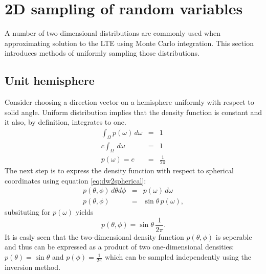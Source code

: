 \section{2D sampling of random variables}
A number of two-dimensional distributions are commonly used when approximating solution to the LTE using Monte Carlo integration. This section introduces methods of uniformly sampling those distributions.

\subsection{Unit hemisphere}
Consider choosing a direction vector on a hemisphere uniformly with respect to solid angle. Uniform distribution implies that the density function is constant and it also, by definition, integrates to one.
\begin{eqnarray}
  \int_{\Omega} p(\omega) \,d\omega &=& 1 \nonumber \\
  c \int_{\Omega} \,d\omega &=& 1 \nonumber \\
  p(\omega) = c &=& \frac{1}{2\pi}
\end{eqnarray}
The next step is to express the density function with respect to spherical coordinates using equation \ref{eq:dw2spherical}:
\begin{eqnarray}
  p(\theta, \phi) \, d\theta d\phi &=& p(\omega) \,d\omega \nonumber \\
  p(\theta, \phi) &=& \sin\theta \,p(\omega),
\end{eqnarray}
subsituting for $p(\omega)$ yields
\begin{equation}
  p(\theta, \phi) = \sin\theta \,\frac{1}{2\pi}.
\end{equation}
It is easly seen that the two-dimensional density function $p(\theta, \phi)$ is seperable and thus can be expressed as a product of two one-dimensional densities: $p(\theta) = \sin\theta$ and $p(\phi) = \frac{1}{2\pi}$ which can be sampled independently using the inversion method.

